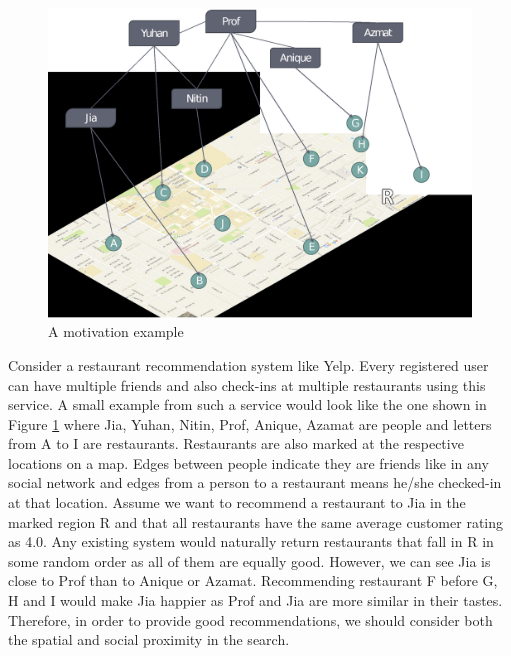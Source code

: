 \begin{figure}[t]
	\centering
	\includegraphics[width=0.75\linewidth]{images/begin_example.eps}
	\caption{A motivation example}
	\label{fig:begin-example}
\end{figure}

Consider a restaurant recommendation system like Yelp. Every registered user can have multiple friends and also check-ins at multiple restaurants using this service. A small example from such a service would look like the one shown in Figure \ref{fig:begin-example} where Jia, Yuhan, Nitin, Prof, Anique, Azamat are people and letters from A to I are restaurants. Restaurants are also marked at the respective locations on a map. Edges between people indicate they are friends like in any social network and edges from a person to a restaurant means he/she checked-in at that location. Assume we want to recommend a restaurant to Jia in the marked region R and that all restaurants have the same average customer rating as 4.0. Any existing system would naturally return restaurants that fall in R in some random order as all of them are equally good. However, we can see Jia is close to Prof than to Anique or Azamat. Recommending restaurant F before G, H and I would make Jia happier as Prof and Jia are more similar in their tastes. Therefore, in order to provide good recommendations, we should consider both the spatial and social proximity in the search.

